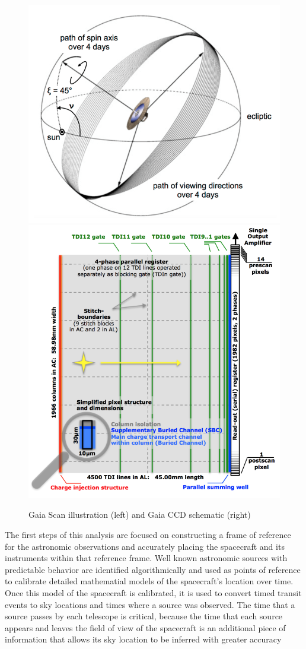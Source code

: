 \documentclass[preprint2]{aastex631}
\begin{document}
\begin{figure}
	\includegraphics[width=0.49\columnwidth]{scanninglaw.png} \includegraphics[width=0.49\columnwidth]{gaiaccd.png}
	\caption{Gaia Scan illustration (left) and Gaia CCD schematic (right) \citep{collaborationGaia2016}}
	 \label{fig:scanninglaw} \label{fig:ccd}
\end{figure}

The first steps of this analysis are focused on constructing a frame of reference for the astronomic observations and accurately placing the spacecraft and its instruments within that reference frame. Well known astronomic sources with predictable behavior are identified algorithmically and used as points of reference to calibrate detailed mathematial models of the spacecraft's location over time. Once this model of the spacecraft is calibrated, it is used to convert timed transit events to sky locations and times where a source was observed. The time that a source passes by each telescope is critical, because the time that each source appears and leaves the field of view of the spacecraft is an additional piece of information that allows its sky location to be inferred with greater accuracy
\end{document}
